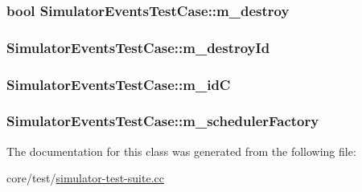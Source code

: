 \subsubsection[{\texorpdfstring{m\+\_\+destroy}{m_destroy}}]{\setlength{\rightskip}{0pt plus 5cm}bool Simulator\+Events\+Test\+Case\+::m\+\_\+destroy}\hypertarget{classSimulatorEventsTestCase_a941dc6beccbb410c8cb17fafbcc28281}{}\label{classSimulatorEventsTestCase_a941dc6beccbb410c8cb17fafbcc28281}
\subsubsection[{\texorpdfstring{m\+\_\+destroy\+Id}{m_destroyId}}]{ Simulator\+Events\+Test\+Case\+::m\+\_\+destroy\+Id}\hypertarget{classSimulatorEventsTestCase_ad41df455eecac73af5e5b6b697c837b8}{}\label{classSimulatorEventsTestCase_ad41df455eecac73af5e5b6b697c837b8}
\subsubsection[{\texorpdfstring{m\+\_\+idC}{m_idC}}]{ Simulator\+Events\+Test\+Case\+::m\+\_\+idC}\hypertarget{classSimulatorEventsTestCase_a21438bed39928a8263b2871ae9859c26}{}\label{classSimulatorEventsTestCase_a21438bed39928a8263b2871ae9859c26}
\subsubsection[{\texorpdfstring{m\+\_\+scheduler\+Factory}{m_schedulerFactory}}]{ Simulator\+Events\+Test\+Case\+::m\+\_\+scheduler\+Factory}\hypertarget{classSimulatorEventsTestCase_ad1d03b9451a4a2cabaa14fd023934618}{}\label{classSimulatorEventsTestCase_ad1d03b9451a4a2cabaa14fd023934618}


The documentation for this class was generated from the following file\+:\begin{DoxyCompactItemize}
\item 
core/test/\hyperlink{simulator-test-suite_8cc}{simulator-\/test-\/suite.\+cc}\end{DoxyCompactItemize}
